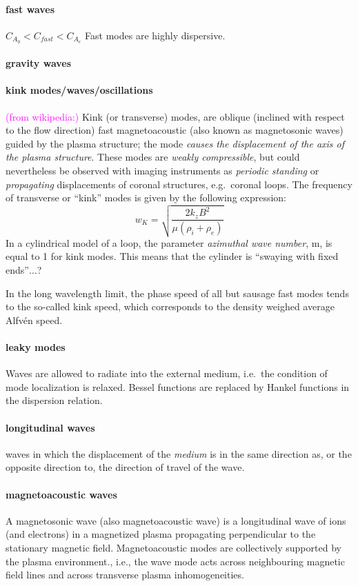\documentclass[12pt]{article}
\begin{document}
\paragraph{fast waves}
$C_{A_0} < C_{fast} < C_{A_e} $
Fast modes are highly dispersive.

\paragraph{gravity waves}

\paragraph{kink modes/waves/oscillations}
\textcolor{magenta}{(from wikipedia:)}
Kink (or transverse) modes,
are oblique (inclined with respect to the flow direction)
fast magnetoacoustic
(also known as magnetosonic waves) guided by the plasma structure;
the mode \emph{causes the displacement of the axis of the plasma structure}.
These modes are \emph{weakly compressible}, but could nevertheless be
observed with imaging instruments as \emph{periodic standing}
or \emph{propagating} displacements of coronal structures, e.g.\ coronal loops.
The frequency of transverse or ``kink'' modes is given by the following expression:
    $$ w_K = \sqrt{ \frac{2k_zB^2}{\mu(\rho_i+\rho_e)}  }   $$
In a cylindrical model of a loop,
the parameter \emph{azimuthal wave number},
m, is equal to 1 for kink modes.
This means that the cylinder is ``swaying with fixed ends''$\ldots$?

In the long wavelength limit, the phase speed of all but
sausage fast modes tends to the so-called kink speed,
which corresponds to the density weighed average Alfv\'en speed.

\paragraph{leaky modes}
Waves are allowed to radiate into the external medium, i.e.\
the condition of mode localization is relaxed.
Bessel functions are replaced by Hankel functions in the
dispersion relation.

\paragraph{longitudinal waves}
waves in which the displacement of the \emph{medium} is in the
same direction as, or the opposite direction to,
the direction of travel of the wave.

\paragraph{magnetoacoustic waves}
A magnetosonic wave (also magnetoacoustic wave) is a longitudinal wave
of ions (and electrons) in a magnetized plasma propagating perpendicular
to the stationary magnetic field.
Magnetoacoustic modes are collectively supported by the plasma
environment., i.e., the wave mode acts across neighbouring magnetic field
lines and across transverse plasma inhomogeneities.
\end{document}
